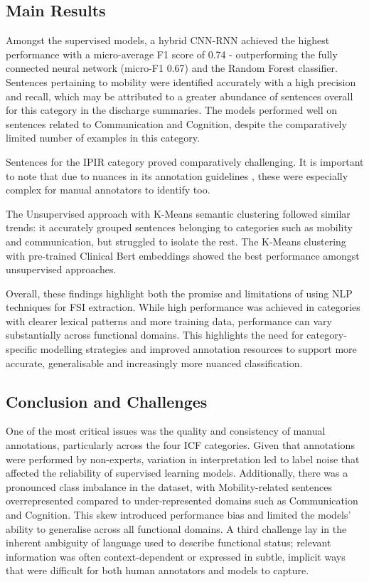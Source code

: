 \subsection{Main Results}
Amongst the supervised models, a hybrid CNN-RNN achieved the highest performance with a micro-average F1 score of 0.74 - outperforming the fully connected neural network (micro-F1 0.67) and the Random Forest classifier. Sentences pertaining to mobility were identified accurately with a high precision and recall, which may be attributed to a greater abundance of sentences overall for this category in the discharge summaries. The models performed well on sentences related to Communication and Cognition, despite the comparatively limited number of examples in this category.\medskip

Sentences for the IPIR category proved comparatively challenging. It is important to note that due to nuances in its annotation guidelines \cite{InterpersonalGuideline2023}, these were especially complex for manual annotators to identify too. \medskip

The Unsupervised approach with K-Means semantic clustering followed similar trends: it accurately grouped sentences belonging to categories such as mobility and communication, but struggled to isolate the rest. The K-Means clustering with pre-trained Clinical Bert embeddings showed the best performance amongst unsupervised approaches.\medskip

Overall, these findings highlight both the promise and limitations of using NLP techniques for FSI extraction. While high performance was achieved in categories with clearer lexical patterns and more training data, performance can vary substantially across functional domains. This highlights the need for category-specific modelling strategies and improved annotation resources to support more accurate, generalisable and increasingly more nuanced classification.

\subsection{Conclusion and Challenges}
One of the most critical issues was the quality and consistency of manual annotations, particularly across the four ICF categories. Given that annotations were performed by non-experts, variation in interpretation led to label noise that affected the reliability of supervised learning models. Additionally, there was a pronounced class imbalance in the dataset, with Mobility-related sentences overrepresented compared to under-represented domains such as Communication and Cognition. This skew introduced performance bias and limited the models’ ability to generalise across all functional domains. A third challenge lay in the inherent ambiguity of language used to describe functional status; relevant information was often context-dependent or expressed in subtle, implicit ways that were difficult for both human annotators and models to capture.


